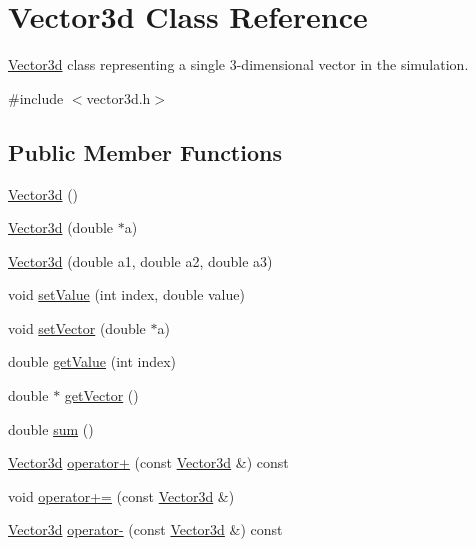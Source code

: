 \hypertarget{classVector3d}{\section{\-Vector3d \-Class \-Reference}
\label{df/dd0/classVector3d}
}


\hyperlink{classVector3d}{\-Vector3d} class representing a single 3-\/dimensional vector in the simulation.  




{\ttfamily \#include $<$vector3d.\-h$>$}

\subsection*{\-Public \-Member \-Functions}
\begin{DoxyCompactItemize}
\item 
\hyperlink{classVector3d_aac098d8695c4288e4844835e62945244}{\-Vector3d} ()
\item 
\hyperlink{classVector3d_a9e5a8c606f27fe366d2075f6bc4759a6}{\-Vector3d} (double $\ast$a)
\item 
\hyperlink{classVector3d_af61756bf2e679ccf2a5c0fd742ae3e6c}{\-Vector3d} (double a1, double a2, double a3)
\item 
void \hyperlink{classVector3d_ac20e0cda09c96f83cc41e23300c303ca}{set\-Value} (int index, double value)
\item 
void \hyperlink{classVector3d_a82c251f7203e08ec50ea55222f40525f}{set\-Vector} (double $\ast$a)
\item 
double \hyperlink{classVector3d_a37055dde72eed6770cf3b2b11b56f0f8}{get\-Value} (int index)
\item 
double $\ast$ \hyperlink{classVector3d_a12ca89ab46c79eb78fa6b75cad1a3616}{get\-Vector} ()
\item 
double \hyperlink{classVector3d_a76fa7fc5a86ba77a6764eb0d9072e90a}{sum} ()
\item 
\hyperlink{classVector3d}{\-Vector3d} \hyperlink{classVector3d_ad714ad56910f370335c18262dc5cc13a}{operator+} (const \hyperlink{classVector3d}{\-Vector3d} \&) const 
\item 
void \hyperlink{classVector3d_a034e9f847d613c9cba1cb47202b8143a}{operator+=} (const \hyperlink{classVector3d}{\-Vector3d} \&)
\item 
\hyperlink{classVector3d}{\-Vector3d} \hyperlink{classVector3d_a727932bfb1f230c8f256e10a0d45a8c7}{operator-\/} (const \hyperlink{classVector3d}{\-Vector3d} \&) const 
\item 

\end{DoxyCompactItemize}
